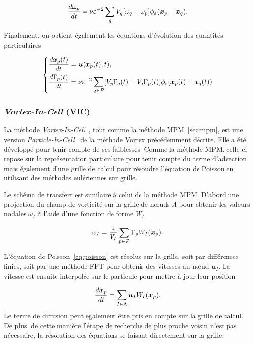 \begin{equation*}
    \frac{d \omega_p}{dt} = \nu \varepsilon^{-2} \sum_q V_q [\omega_q - \omega_p] \phi_\varepsilon(\bm{x}_p - \bm{x}_q).
\end{equation*}

Finalement, on obtient également les équations d'évolution des quantités particulaires

\begin{gather*}
    \left\{\begin{aligned}
         & \frac{d \bm{x}_p(t)}{dt} = \bm u(\bm{x}_p(t), t),                                                                                                      \\
         & \frac{d\Gamma_p(t)}{dt} = \nu \varepsilon^{-2} \sum_{q \in \mathcal P} [V_p \Gamma_q(t) - V_q \Gamma_p(t)] \phi_\varepsilon(\bm{x}_p(t) - \bm{x}_q(t))
    \end{aligned}\right.
\end{gather*}

\subsubsection{\textit{Vortex-In-Cell} (VIC)}

La méthode \textit{Vortex-In-Cell}~\cite{christiansen_1973}, tout comme la méthode MPM~\ref{sec:mpm}, est une version \textit{Particle-In-Cell}~\cite{birdsall_1969} de la méthode Vortex précédemment décrite. Elle a été développé pour tenir compte de ses faiblesses. Comme la méthode MPM, celle-ci repose sur la représentation particulaire pour tenir compte du terme d'advection mais également d'une grille de calcul pour résoudre l'équation de Poisson en utilisant des méthodes eulériennes sur grille.

Le schéma de transfert est similaire à celui de la méthode MPM. D'abord une projection du champ de vorticité sur la grille de nœuds $\Lambda$ pour obtenir les valeurs nodales $\omega_I$ à l'aide d'une fonction de forme $W_I$

\begin{equation*}
    \omega_I = \frac{1}{V_I}\sum_{p \in \mathcal P} \Gamma_p W_I(\bm{x}_p).
\end{equation*}

L'équation de Poisson~\ref{eq:poisson} est résolue sur la grille, soit par différences finies, soit par une méthode FFT pour obtenir des vitesses au nœud $\bm u_I$. La vitesse est ensuite interpolée sur le particule pour mettre à jour leur position

\begin{equation*}
    \frac{d \bm x_p}{d t} = \sum_{I \in \Lambda} \bm u_I W_I(\bm{x}_p).
\end{equation*}
Le terme de diffusion peut également être pris en compte sur la grille de calcul. De plus, de cette manière l'étape de recherche de plus proche voisin n'est pas nécessaire, la résolution des équations se faisant directement sur la grille.




